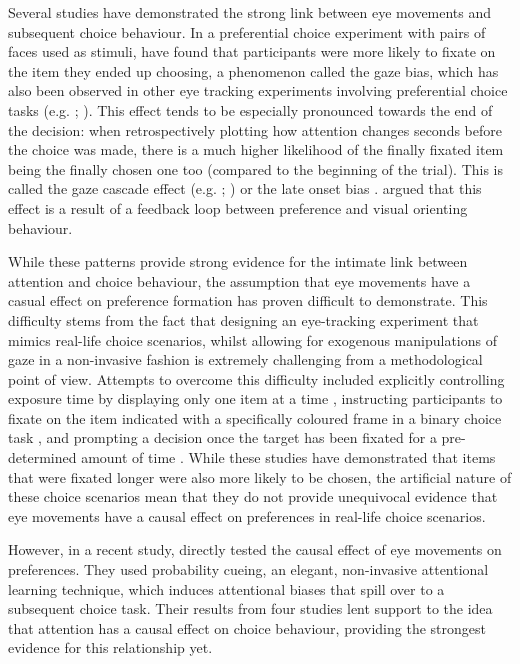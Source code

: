 \documentclass[11pt,a4paper]{article}
\begin{document}
 Several studies have demonstrated the strong link between eye movements and subsequent choice behaviour. In a preferential choice experiment with pairs of faces used as stimuli,  have found that participants were more likely to fixate on the item they ended up choosing, a phenomenon called the gaze bias, which has also been observed in other eye tracking experiments involving preferential choice tasks (e.g. ; ). This effect tends to be especially pronounced towards the end of the decision: when retrospectively plotting how attention changes seconds before the choice was made, there is a much higher likelihood of the finally fixated item being the finally chosen one too (compared to the beginning of the trial). This is called the gaze cascade effect (e.g. ; ) or the late onset bias \cite{Mullett2016}.  argued that this effect is a result of a feedback loop between preference and visual orienting behaviour. 

While these patterns provide strong evidence for the intimate link between attention and choice behaviour, the assumption that eye movements have a casual effect on preference formation has proven difficult to demonstrate. This difficulty stems from the fact that designing an eye-tracking experiment that mimics real-life choice scenarios, whilst allowing for exogenous manipulations of gaze in a non-invasive fashion is extremely challenging from a methodological point of view. Attempts to overcome this difficulty included explicitly controlling exposure time by displaying only one item at a time \cite{Armel2008}, instructing participants to fixate on the item indicated with a specifically coloured frame in a binary choice task \cite{Lim2011}, and prompting a decision once the target has been fixated for a pre-determined amount of time \cite{Parnamets2015}. While these studies have demonstrated that items that were fixated longer were also more likely to be chosen, the artificial nature of these choice scenarios mean that they do not provide unequivocal evidence that eye movements have a causal effect on preferences in real-life choice scenarios. 

However, in a recent study,  directly tested the causal effect of eye movements on preferences. They used probability cueing, an elegant, non-invasive attentional learning technique, which induces attentional biases that spill over to a subsequent choice task. Their results from four studies lent support to the idea that attention has a causal effect on choice behaviour, providing the strongest evidence for this relationship yet.
\end{document}
